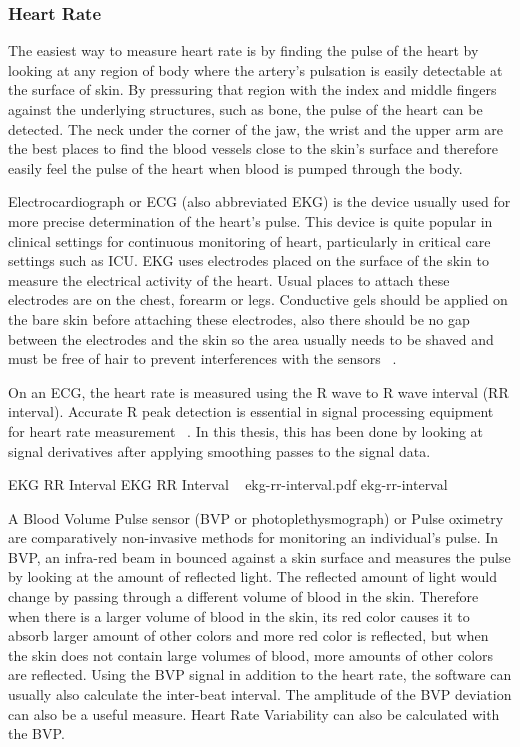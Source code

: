 \subsubsection{Heart Rate}
The easiest way to measure heart rate is by finding the pulse of the heart by looking at any region of body where the artery's pulsation is easily detectable at the surface of skin. By pressuring that region with the index and middle fingers against the underlying structures, such as bone, the pulse of the heart can be detected. The neck under the corner of the jaw, the wrist and the upper arm are the best places to find the blood vessels close to the skin's surface and therefore easily feel the pulse of the heart when blood is pumped through the body. %

Electrocardiograph or ECG (also abbreviated EKG) is the device usually used for more precise determination of the heart's pulse. This device is quite popular in clinical settings for continuous monitoring of heart, particularly in critical care settings such as ICU. EKG uses electrodes placed on the surface of the skin to measure the electrical activity of the heart. Usual places to attach these electrodes are on the chest, forearm or legs. Conductive gels should be applied on the bare skin before attaching these electrodes, also there should be no gap between the electrodes and the skin so the area usually needs to be shaved and must be free of hair to prevent interferences with the sensors ~\cite{stern2001psychophysiological}.

On an ECG, the heart rate is measured using the R wave to R wave interval (RR interval). Accurate R peak detection is essential in signal processing equipment for heart rate measurement ~\cite{pise2011thinkquest}. In this thesis, this has been done by looking at signal derivatives after applying smoothing passes to the signal data.

\img
{EKG RR Interval}
{EKG RR Interval ~\cite{wiki2014bvp}}
{ekg-rr-interval.pdf}
{ekg-rr-interval}

A Blood Volume Pulse sensor (BVP or photoplethysmograph) or Pulse oximetry are comparatively non-invasive methods for monitoring an individual's pulse. In BVP, an infra-red beam in bounced against a skin surface and measures the pulse by looking at the amount of reflected light. The reflected amount of light would change by passing through a different volume of blood in the skin. Therefore when there is a larger volume of blood in the skin, its red color causes it to absorb larger amount of other colors and more red color is reflected, but when the skin does not contain large volumes of blood, more amounts of other colors are reflected. %
Using the BVP signal in addition to the heart rate, the software can usually also calculate the inter-beat interval. The amplitude of the BVP deviation can also be a useful measure. Heart Rate Variability can also be calculated with the BVP.

